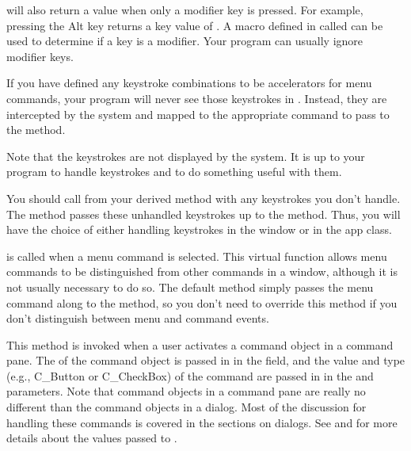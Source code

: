  will also return a value when only a modifier key is
pressed. For example, pressing the Alt key returns a key value of
. A macro defined in 
called  can be used to determine if a key
 is a modifier. Your program can usually ignore modifier
keys.

If you have defined any keystroke combinations to be accelerators
for menu commands, your program will never see those keystrokes
in . Instead, they are intercepted by the system and
mapped to the appropriate command to pass to the 
method.

Note that the keystrokes are not displayed by the system. It is
up to your program to handle keystrokes and to do something
useful with them.

You should call  from your derived method
with any keystrokes you don't handle. The 
method passes these unhandled keystrokes up to the 
method. Thus, you will have the choice of either handling
keystrokes in the window or in the app class.


 is called when a menu command is selected.
This virtual function allows menu commands to be distinguished
from other commands in a window, although it is not usually
necessary to do so. The default method simply passes the menu
command along to the  method, so you don't
need to override this method if you don't distinguish between
menu and command events.


This method is invoked when a user activates a command object in
a command pane. The  of the command object is passed in
in the  field, and the value and type (e.g., C\_Button
or C\_CheckBox) of the command are passed in in the 
and  parameters. Note that command objects in a
command pane are really no different than the command objects in a
dialog. Most of the discussion for handling these commands is
covered in the sections on dialogs. See  and 
 for more details about the values
passed to .

